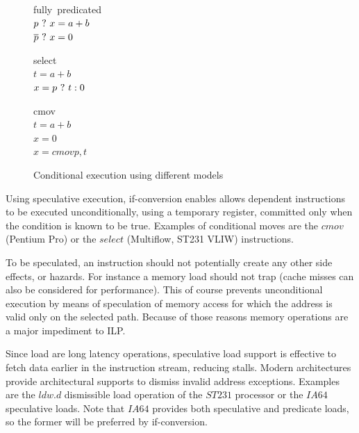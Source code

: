 \begin{figure}
\footnotesize
\begin{minipage}[t]{3cm}
\mbox{fully predicated} \\
$p ~?~ x = a + b $ \\
$\overline{p} ~?~ x = 0 $ \\
\end{minipage} 
\begin{minipage}[t]{3cm}
\mbox{select} \\
$t = a + b $ \\
$x= p ~?~ t : 0 $ \\
\end{minipage}
\begin{minipage}[t]{3cm}
\mbox{cmov} \\
$t = a + b $ \\
$x = 0 $ \\
$x = cmov p,t$ \\
\end{minipage}
\caption{Conditional execution using different models}
\label{fig:pred}
\end{figure}

Using speculative execution, if-conversion enables allows dependent instructions to be executed unconditionally, using a temporary register, committed only when the condition is known to be true. Examples of conditional moves are the $cmov$ (Pentium Pro) or the $select$ (Multiflow, ST231 VLIW) instructions.

To be speculated, an instruction should not potentially create any other side effects, or hazards. For instance a memory load should not trap (cache misses can also be considered for performance). This of course prevents unconditional execution by means of speculation of memory access for which the address is valid only on the selected path. Because of those reasons memory operations are a major impediment to ILP. 

Since load are long latency operations, speculative load support is effective to fetch data earlier in the instruction stream, reducing stalls. Modern architectures provide architectural supports to dismiss invalid address exceptions. Examples are the $ldw.d$ dismissible load operation of the $ST231$ processor or the $IA64$ speculative loads. Note that $IA64$ provides both speculative and predicate loads, so the former will be preferred by if-conversion. 


